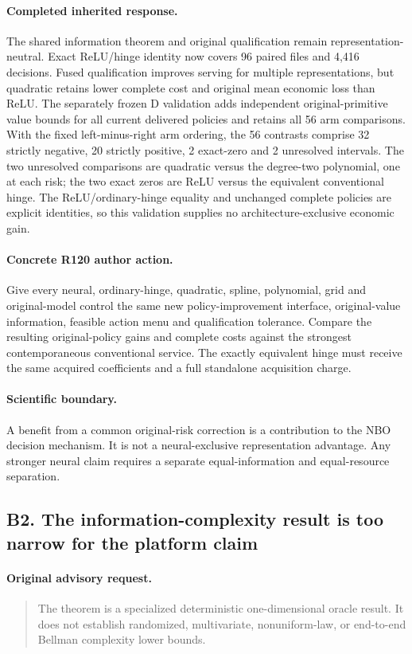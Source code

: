 \paragraph{Completed inherited response.}
The shared information theorem and original qualification remain representation-neutral. Exact ReLU/hinge identity now covers 96 paired files and 4,416 decisions. Fused qualification improves serving for multiple representations, but quadratic retains lower complete cost and original mean economic loss than ReLU. The separately frozen D validation adds independent original-primitive value bounds for all current delivered policies and retains all 56 arm comparisons. With the fixed left-minus-right arm ordering, the 56 contrasts comprise 32 strictly negative, 20 strictly positive, 2 exact-zero and 2 unresolved intervals. The two unresolved comparisons are quadratic versus the degree-two polynomial, one at each risk; the two exact zeros are ReLU versus the equivalent conventional hinge. The ReLU/ordinary-hinge equality and unchanged complete policies are explicit identities, so this validation supplies no architecture-exclusive economic gain.
\paragraph{Concrete R120 author action.}
Give every neural, ordinary-hinge, quadratic, spline, polynomial, grid and original-model control the same new policy-improvement interface, original-value information, feasible action menu and qualification tolerance. Compare the resulting original-policy gains and complete costs against the strongest contemporaneous conventional service. The exactly equivalent hinge must receive the same acquired coefficients and a full standalone acquisition charge.
\paragraph{Scientific boundary.}
A benefit from a common original-risk correction is a contribution to the NBO decision mechanism. It is not a neural-exclusive representation advantage. Any stronger neural claim requires a separate equal-information and equal-resource separation.

\subsection{B2. The information-complexity result is too narrow for the platform claim}
\label{response120:B2}
\paragraph{Original advisory request.}
\begin{quote}
The theorem is a specialized deterministic one-dimensional oracle result. It does not establish randomized, multivariate, nonuniform-law, or end-to-end Bellman complexity lower bounds.
\end{quote}
